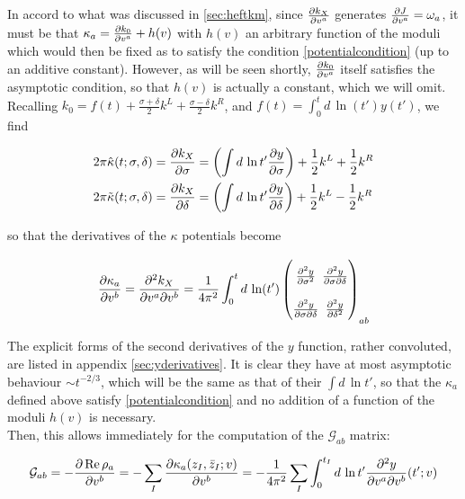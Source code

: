 In accord to what was discussed in \ref{sec:heftkm}, since $\frac{\partial k_X}{\partial v^a}$ generates $\frac{\partial J}{\partial v^a} = \omega_a$, it must be that $\kappa_a = \frac{\partial k_0}{\partial v^a} + h(v)$ with $h(v)$ an arbitrary function of the moduli which would then be fixed as to satisfy the condition \ref{potentialcondition} (up to an additive constant). However, as will be seen shortly, $\frac{\partial k_0}{\partial v^a}$ itself satisfies the asymptotic condition, so that $h(v)$ is actually a constant, which we will omit.\\

Recalling $k_0 = f(t) + \frac{\sigma+\delta}{2} k^L + \frac{\sigma-\delta}{2} k^R$, and $f(t) = \int_0^t d \, \ln(t') y(t')$, we find

\begin{align}
 	2\pi \hat\kappa(t;\sigma,\delta) =	\frac{\partial k_X}{\partial\sigma} & = \left( \int d\, \ln t' \frac{\partial y}{\partial\sigma} \right) + \frac{1}2 k^L + \frac{1}2 k^R \\
	2\pi \tilde\kappa(t;\sigma,\delta) =  \frac{\partial k_X}{\partial\delta} & = \left( \int d\, \ln t' \frac{\partial y}{\partial\delta} \right) + \frac{1}2 k^L - \frac{1}2 k^R
	\label{}
\end{align}

so that the derivatives of the $\kappa$ potentials become

\begin{equation}
\arraycolsep=1.4pt\def\arraystretch{2.2}
\pder{\kappa_a}{v^b} = \frac{\partial^2 k_X}{\partial v^a \partial v^b} = \frac{1}{4 \pi^2} \int_0^t d\, \ln(t')
	\begin{pmatrix}
		\frac{\partial^2 y}{\partial \sigma^2} & \frac{\partial^2 y}{\partial \sigma \partial \delta} \\
		\frac{\partial^2 y}{\partial \sigma\partial \delta} & \frac{\partial^2 y}{\partial \delta^2}
	\end{pmatrix}_{ab}
	\label{}
\end{equation}

The explicit forms of the second derivatives of the $y$ function, rather convoluted, are listed in appendix \ref{sec:yderivatives}. It is clear they have at most asymptotic behaviour $\sim t^{-2/3}$, which will be the same as that of their $\int d\,\ln t'$, so that the $\kappa_a$ defined above satisfy \ref{potentialcondition} and no addition of a function of the moduli $h(v)$ is necessary.\\

Then, this allows immediately for the computation of the $\mathcal{G}_{ab}$ matrix:

\begin{equation}
	\mathcal{G}_{ab} = - \frac{\partial\operatorname{Re} \rho_a}{\partial v^b}  = - \sum_I \frac{\partial \kappa_a(z_I,\bar z_I; v)}{\partial v^b} = - \frac{1}{4\pi^2} \sum_I \int_0^{t_I} d\,\ln t' \frac{\partial^2 y}{\partial v^a \partial v^b} (t' ; v)
	\label{}
\end{equation}

